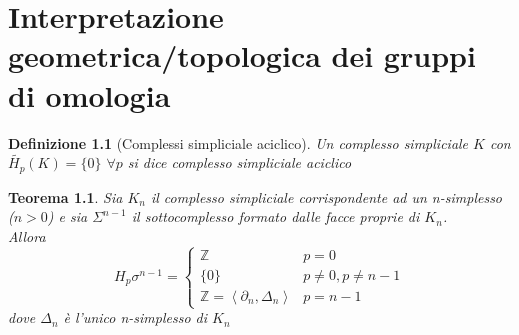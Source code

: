 \documentclass[a4paper]{report}
\newtheorem{theorem}{Teorema}
\newtheorem{definition}{Definizione}
\newcommand{\Z}{\ensuremath{\mathbb{Z}}}
\newcommand{\gen}[1]{\ensuremath{\left<{#1}\right>}}
\begin{document}
\chapter{Interpretazione geometrica/topologica dei gruppi di omologia}
\begin{definition}[Complessi simpliciale aciclico]
    Un complesso simpliciale $K$ con $\tilde{H_p}(K)=\{0\}$ $\forall p$ si dice complesso simpliciale aciclico
\end{definition}
\begin{theorem}
    Sia $K_n$ il complesso simpliciale corrispondente ad un n-simplesso ($n>0$) e sia $\Sigma^{n-1}$ il sottocomplesso formato dalle facce proprie di $K_n$.\\
    Allora
    \[
        H_p{\sigma^{n-1}}=\begin{cases}
            \Z & p=0\\
            \{0\} & p\neq0,p\neq n-1\\
            \Z=\gen{\partial_n,\Delta_n} & p=n-1
        \end{cases}    
    \]
    dove $\Delta_n$ è l'unico n-simplesso di $K_n$
\end{theorem}
\end{document}
